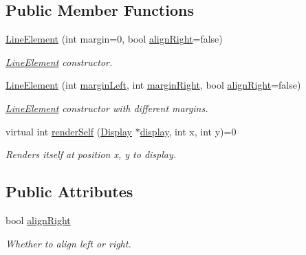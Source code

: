 \subsection*{Public Member Functions}
\begin{DoxyCompactItemize}
\item 
\mbox{\hyperlink{classScreen_1_1LineElement_a3f822f160e15ee96022b95026e52ee42}{Line\+Element}} (int margin=0, bool \mbox{\hyperlink{classScreen_1_1LineElement_a0c5f4e33c2df1dce8e4e45b90dac1423}{align\+Right}}=false)
\begin{DoxyCompactList}\small\item\em \mbox{\hyperlink{classScreen_1_1LineElement}{Line\+Element}} constructor. \end{DoxyCompactList}\item 
\mbox{\hyperlink{classScreen_1_1LineElement_a65fe216ee2acbc1191b1fd51b25b2ec7}{Line\+Element}} (int \mbox{\hyperlink{classScreen_1_1LineElement_a9ed23f9510a11334af9be6f53965f7a6}{margin\+Left}}, int \mbox{\hyperlink{classScreen_1_1LineElement_a3a2077f01072be8e8fd0f4539b85beb0}{margin\+Right}}, bool \mbox{\hyperlink{classScreen_1_1LineElement_a0c5f4e33c2df1dce8e4e45b90dac1423}{align\+Right}}=false)
\begin{DoxyCompactList}\small\item\em \mbox{\hyperlink{classScreen_1_1LineElement}{Line\+Element}} constructor with different margins. \end{DoxyCompactList}\item 
virtual int \mbox{\hyperlink{classScreen_1_1LineElement_a667fbf6505fbed274ca9a3deac3fef9e}{render\+Self}} (\mbox{\hyperlink{classDisplay}{Display}} $\ast$\mbox{\hyperlink{classScreen_aad713267725e8aa8a8def951a07de641}{display}}, int x, int y)=0
\begin{DoxyCompactList}\small\item\em Renders itself at position x, y to display. \end{DoxyCompactList}\end{DoxyCompactItemize}
\subsection*{Public Attributes}
\begin{DoxyCompactItemize}
\item 
\mbox{\label{classScreen_1_1LineElement_a0c5f4e33c2df1dce8e4e45b90dac1423}} 
bool \mbox{\hyperlink{classScreen_1_1LineElement_a0c5f4e33c2df1dce8e4e45b90dac1423}{align\+Right}}
\begin{DoxyCompactList}\small\item\em Whether to align left or right. \end{DoxyCompactList}\end{DoxyCompactItemize}
